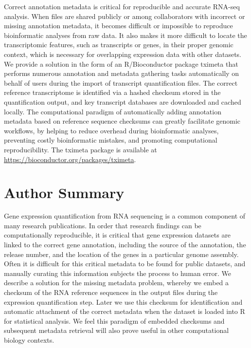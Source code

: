 \documentclass[10pt,letterpaper]{article}
\begin{document}
Correct annotation metadata is critical for reproducible and accurate
RNA-seq analysis. When files are shared publicly or among
collaborators with incorrect or missing annotation metadata, it
becomes difficult or impossible to reproduce bioinformatic analyses
from raw data. It also makes it more difficult to locate the
transcriptomic features, such as transcripts or genes, in their proper
genomic context, which is necessary for overlapping expression data
with other datasets. We provide a solution in the form of an
R/Bioconductor package tximeta that performs numerous annotation and
metadata gathering tasks automatically on behalf of users during the
import of transcript quantification files. The correct reference
transcriptome is identified via a hashed checksum stored in the
quantification output, and key transcript databases are downloaded and
cached locally. The computational paradigm of automatically adding
annotation metadata based on reference sequence checksums can greatly
facilitate genomic workflows, by helping to reduce overhead during
bioinformatic analyses, preventing costly bioinformatic mistakes, and
promoting computational reproducibility.
The tximeta package is
available at \url{https://bioconductor.org/packages/tximeta}.

\linenumbers

\section*{Author Summary}

Gene expression quantification from RNA sequencing is a common
component of many research publications. In order that research
findings can be computationally reproducible, it is critical that gene
expression datasets are linked to the correct gene annotation,
including the source of the annotation, the release number, and the
location of the genes in a particular genome assembly. Often it is
difficult for this critical metadata to be found for public datasets,
and manually curating this information subjects the process to human
error. We describe a solution for the missing metadata problem,
whereby we embed a checksum of the RNA reference sequences in the
output files during the expression quantification step. Later we use
this checksum for identification and automatic attachment of the
correct metadata when the dataset is loaded into R for statistical
analysis. We feel this paradigm of embedded checksums and subsequent
metadata retrieval will also prove useful in other computational
biology contexts.
\end{document}
